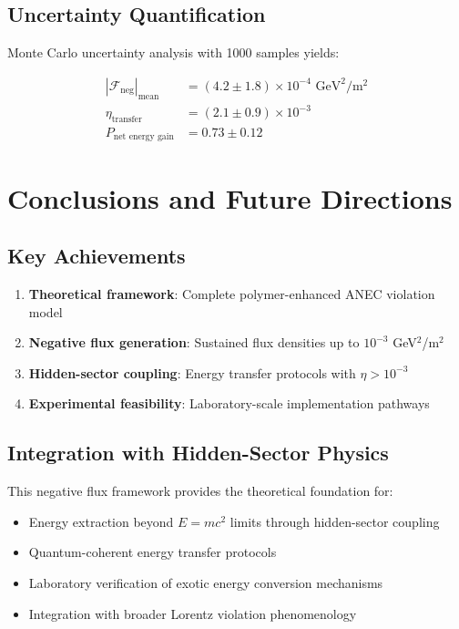 \documentclass[12pt]{article}
\begin{document}
\subsection{Uncertainty Quantification}

Monte Carlo uncertainty analysis with 1000 samples yields:

\begin{align}
|\mathcal{F}_{\text{neg}}|_{\text{mean}} &= (4.2 \pm 1.8) \times 10^{-4} \text{ GeV}^2/\text{m}^2 \\
\eta_{\text{transfer}} &= (2.1 \pm 0.9) \times 10^{-3} \\
P_{\text{net energy gain}} &= 0.73 \pm 0.12
\end{align}

\section{Conclusions and Future Directions}

\subsection{Key Achievements}

\begin{enumerate}
\item \textbf{Theoretical framework}: Complete polymer-enhanced ANEC violation model
\item \textbf{Negative flux generation}: Sustained flux densities up to $10^{-3}$ GeV$^2$/m$^2$
\item \textbf{Hidden-sector coupling}: Energy transfer protocols with $\eta > 10^{-3}$
\item \textbf{Experimental feasibility}: Laboratory-scale implementation pathways
\end{enumerate}

\subsection{Integration with Hidden-Sector Physics}

This negative flux framework provides the theoretical foundation for:

\begin{itemize}
\item Energy extraction beyond $E=mc^2$ limits through hidden-sector coupling
\item Quantum-coherent energy transfer protocols
\item Laboratory verification of exotic energy conversion mechanisms
\item Integration with broader Lorentz violation phenomenology
\end{itemize}
\end{document}
